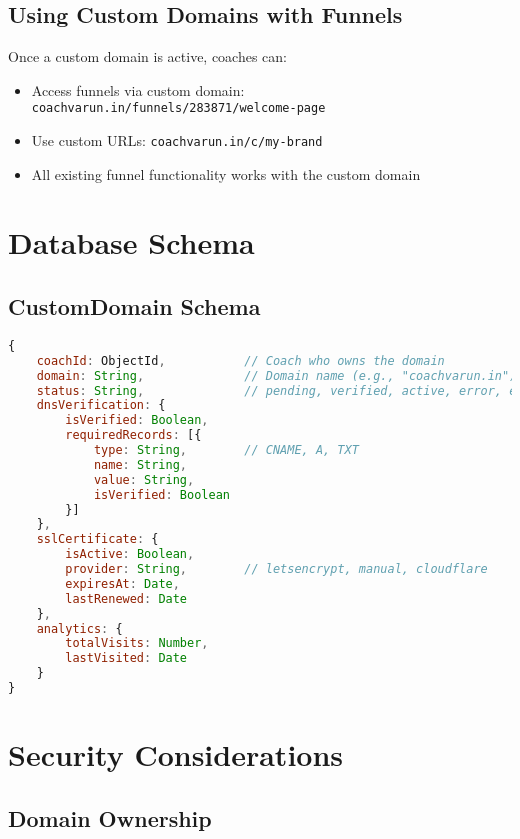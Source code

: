 \documentclass[12pt,a4paper]{article}
\begin{document}
\subsection{Using Custom Domains with Funnels}

Once a custom domain is active, coaches can:

\begin{itemize}
    \item Access funnels via custom domain: \texttt{coachvarun.in/funnels/283871/welcome-page}
    \item Use custom URLs: \texttt{coachvarun.in/c/my-brand}
    \item All existing funnel functionality works with the custom domain
\end{itemize}

\section{Database Schema}

\subsection{CustomDomain Schema}

\begin{lstlisting}[language=javascript]
{
    coachId: ObjectId,           // Coach who owns the domain
    domain: String,              // Domain name (e.g., "coachvarun.in")
    status: String,              // pending, verified, active, error, expired
    dnsVerification: {
        isVerified: Boolean,
        requiredRecords: [{
            type: String,        // CNAME, A, TXT
            name: String,
            value: String,
            isVerified: Boolean
        }]
    },
    sslCertificate: {
        isActive: Boolean,
        provider: String,        // letsencrypt, manual, cloudflare
        expiresAt: Date,
        lastRenewed: Date
    },
    analytics: {
        totalVisits: Number,
        lastVisited: Date
    }
}
\end{lstlisting}

\section{Security Considerations}

\subsection{Domain Ownership}
\end{document}
